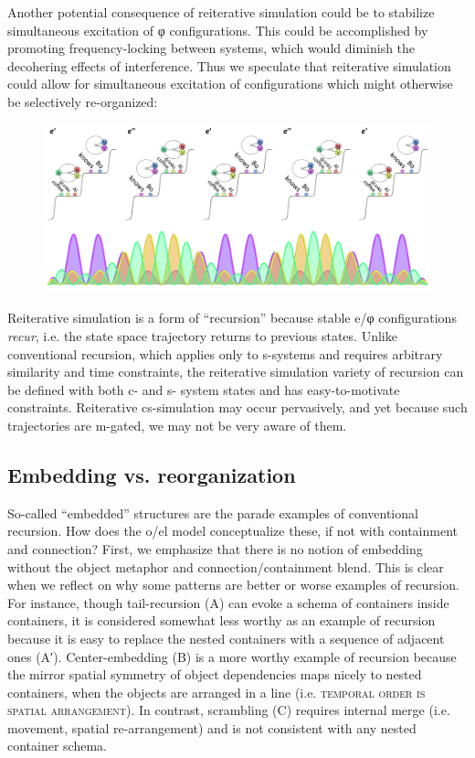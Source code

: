   Another potential consequence of reiterative simulation could be to stabilize simultaneous excitation of φ configurations. This could be accomplished by promoting frequency-locking between systems, which would diminish the decohering effects of interference. Thus we speculate that reiterative simulation could allow for simultaneous excitation of configurations which might otherwise be selectively re-organized:

  
\begin{figure}
\includegraphics[width=\textwidth]{figures/Tilsen-img117.png}
\caption{\missingcaption}
\label{fig:}
\end{figure}
 

  Reiterative simulation is a form of “recursion” because stable e/φ configurations \textit{recur}, i.e. the state space trajectory returns to previous states. Unlike conventional recursion, which applies only to s-systems and requires arbitrary similarity and time constraints, the reiterative simulation variety of recursion can be defined with both c- and s- system states and has easy-to-motivate constraints. Reiterative cs-simulation may occur pervasively, and yet because such trajectories are m-gated, we may not be very aware of them. 

\subsection{Embedding vs. reorganization}

So-called “embedded” structures are the parade examples of conventional recursion. How does the o/el model conceptualize these, if not with containment and connection? First, we emphasize that there is no notion of embedding without the object metaphor and connection/containment blend. This is clear when we reflect on why some patterns are better or worse examples of recursion. For instance, though tail-recursion (A) can evoke a schema of containers inside containers, it is considered somewhat less worthy as an example of recursion because it is easy to replace the nested containers with a sequence of adjacent ones (A′). Center-embedding (B) is a more worthy example of recursion because the mirror spatial symmetry of object dependencies maps nicely to nested containers, when the objects are arranged in a line (i.e. \textsc{temporal order is spatial arrangement}). In contrast, scrambling (C) requires internal merge (i.e. movement, spatial re-arrangement) and is not consistent with any nested container schema.

